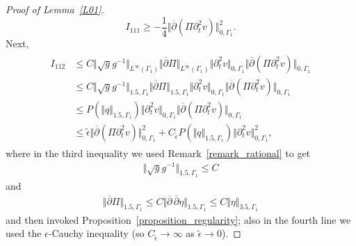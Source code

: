 \documentclass[10pt,reqno]{amsart}
\theoremstyle{plain}
\theoremstyle{definition}
\numberwithin{equation}{section}
\newcommand{\Ga}{\Gamma}
\newcommand{\rar}{\rightarrow}
\newcommand{\norm}[1]{\Vert#1\Vert}
\begin{document}
\begin{proof}[Proof of Lemma~\ref{L01}]
\begin{equation*}
    I_{111}\ge -\frac14\norm{ \overline{\partial} (\Pi \partial^2_t v) }^2_{0,\Ga_1}   
   .
  \end{equation*}
Next,
\begin{align}
\begin{split}
I_{112} & \leq C \norm{ \sqrt{g} g^{-1} }_{L^\infty(\Ga_1)}
 \norm{ \overline{\partial} \Pi}_{L^\infty(\Ga_1)} \norm{\partial^2_t v}_{0,\Ga_1}
 \norm{\overline{\partial } (\Pi \partial^2_t v)}_{0,\Ga_1}
 \\
 &
 \leq 
 C \norm{ \sqrt{g} g^{-1} }_{1.5,\Ga_1}
 \norm{ \overline{\partial} \Pi}_{1.5,\Ga_1} \norm{\partial^2_t v}_{0,\Ga_1}
 \norm{\overline{\partial } (\Pi \partial^2_t v)}_{0,\Ga_1}
 \\
 &
 \leq P (\norm{q}_{1.5,\Ga_1} ) \norm{ \partial^2_t v}_{0,\Ga_1}
  \norm{\overline{\partial } (\Pi \partial^2_t v)}_{0,\Ga_1}
  \\
  &
  \leq   \widetilde{\epsilon} \norm{\overline{\partial } (\Pi \partial^2_t v)}_{0,\Ga_1}^2
  + C_{\widetilde{\epsilon}}   P(\norm{q}_{1.5,\Ga_1} )
  \norm{\partial^2_t v}_{0,\Ga_1}^2,
\end{split}
\nonumber
\end{align}
where in the third inequality we used Remark~\ref{remark_rational} to get
  \begin{gather}
   \norm{ \sqrt{g} g^{-1} }_{1.5,\Ga_1} \leq C
   \nonumber
  \end{gather}
and 
\begin{gather}
 \norm{ \overline{\partial} \Pi}_{1.5,\Ga_1} \leq C \norm{\overline{\partial} \,\overline{\partial}
 \eta}_{1.5,\Ga_1} \leq C \norm{\eta}_{3.5,\Ga_1}
 \nonumber
\end{gather}
and then invoked Proposition~\ref{proposition_regularity}; also in the fourth line 
we used the $\epsilon$-Cauchy inequality (so $C_{\widetilde{\epsilon}} \rar \infty$
as $\widetilde{\epsilon} \rar 0$).


\end{proof}
\end{document}
